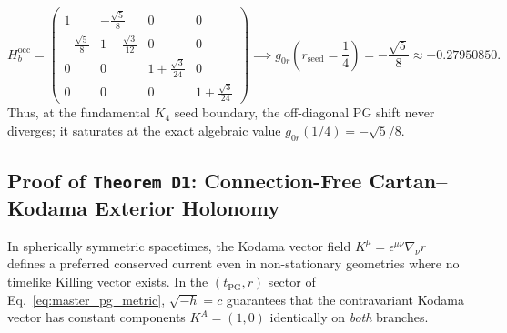 \documentclass[11pt,a4paper]{article}
\theoremstyle{remark}
\begin{document}
\begin{enumerate}
  \begin{equation}
    H_b^{\mathrm{occ}} =
    \begin{pmatrix}
      1 & -\frac{\sqrt{5}}{8} & 0 & 0 \\[4pt]
      -\frac{\sqrt{5}}{8} & 1 - \frac{\sqrt{3}}{12} & 0 & 0 \\[4pt]
      0 & 0 & 1 + \frac{\sqrt{3}}{24} & 0 \\[4pt]
      0 & 0 & 0 & 1 + \frac{\sqrt{3}}{24}
    \end{pmatrix}
    \implies g_{0r}\!\left(r_{\mathrm{seed}} = \frac{1}{4}\right) = -\frac{\sqrt{5}}{8} \approx -0.27950850.
    \label{eq:hb_occ_matrix}
  \end{equation}
  Thus, at the fundamental $K_4$ seed boundary, the off-diagonal PG shift never diverges; it saturates at the exact algebraic value $g_{0r}(1/4) = -\sqrt{5}/8$.
\end{enumerate}

\subsection{Proof of \texttt{Theorem D1}: Connection-Free Cartan--Kodama Exterior Holonomy}

In spherically symmetric spacetimes, the Kodama vector field $K^\mu = \epsilon^{\mu\nu}\nabla_\nu r$ \cite{Kodama1980,Hayward1998} defines a preferred conserved current even in non-stationary geometries where no timelike Killing vector exists. In the $(t_{\mathrm{PG}}, r)$ sector of Eq.~\eqref{eq:master_pg_metric}, $\sqrt{-h} = c$ guarantees that the contravariant Kodama vector has constant components $K^A = (1, 0)$ identically on \emph{both} branches.
\end{document}
